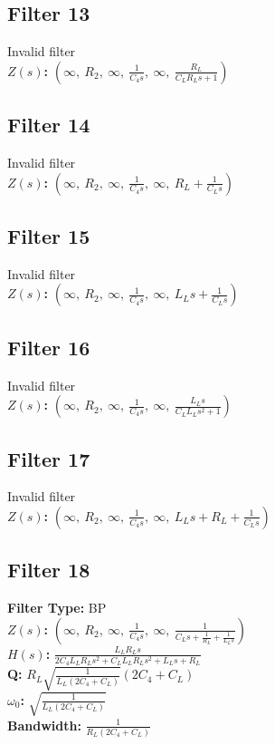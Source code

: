 \documentclass{article}
\begin{document}
\subsection*{Filter 13}
Invalid filter \\ 
\textbf{$Z(s)$:} $\left( \infty, \  R_{2}, \  \infty, \  \frac{1}{C_{4} s}, \  \infty, \  \frac{R_{L}}{C_{L} R_{L} s + 1}\right)$ \\ 
\subsection*{Filter 14}
Invalid filter \\ 
\textbf{$Z(s)$:} $\left( \infty, \  R_{2}, \  \infty, \  \frac{1}{C_{4} s}, \  \infty, \  R_{L} + \frac{1}{C_{L} s}\right)$ \\ 
\subsection*{Filter 15}
Invalid filter \\ 
\textbf{$Z(s)$:} $\left( \infty, \  R_{2}, \  \infty, \  \frac{1}{C_{4} s}, \  \infty, \  L_{L} s + \frac{1}{C_{L} s}\right)$ \\ 
\subsection*{Filter 16}
Invalid filter \\ 
\textbf{$Z(s)$:} $\left( \infty, \  R_{2}, \  \infty, \  \frac{1}{C_{4} s}, \  \infty, \  \frac{L_{L} s}{C_{L} L_{L} s^{2} + 1}\right)$ \\ 
\subsection*{Filter 17}
Invalid filter \\ 
\textbf{$Z(s)$:} $\left( \infty, \  R_{2}, \  \infty, \  \frac{1}{C_{4} s}, \  \infty, \  L_{L} s + R_{L} + \frac{1}{C_{L} s}\right)$ \\ 
\subsection*{Filter 18}
\textbf{Filter Type:} BP \\ 
\textbf{$Z(s)$:} $\left( \infty, \  R_{2}, \  \infty, \  \frac{1}{C_{4} s}, \  \infty, \  \frac{1}{C_{L} s + \frac{1}{R_{L}} + \frac{1}{L_{L} s}}\right)$ \\ 
\textbf{$H(s)$:} $\frac{L_{L} R_{L} s}{2 C_{4} L_{L} R_{L} s^{2} + C_{L} L_{L} R_{L} s^{2} + L_{L} s + R_{L}}$ \\ 
\textbf{Q:} $R_{L} \sqrt{\frac{1}{L_{L} \left(2 C_{4} + C_{L}\right)}} \left(2 C_{4} + C_{L}\right)$ \\ 
\textbf{$\omega_0$:} $\sqrt{\frac{1}{L_{L} \left(2 C_{4} + C_{L}\right)}}$ \\ 
\textbf{Bandwidth:} $\frac{1}{R_{L} \left(2 C_{4} + C_{L}\right)}$ \\ 
\end{document}
